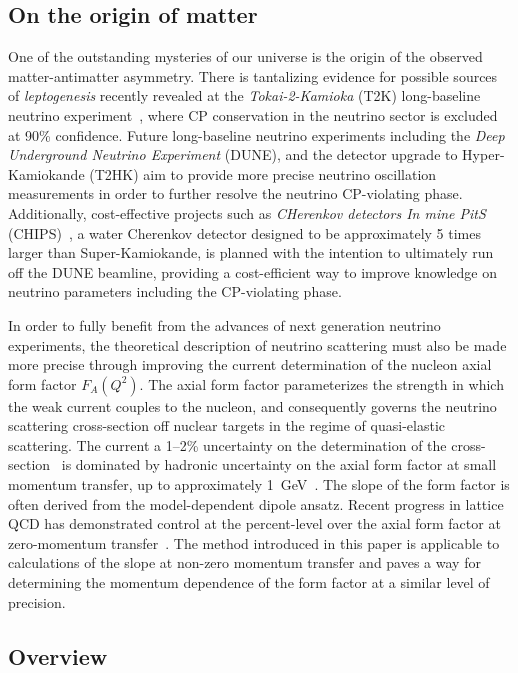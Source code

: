 \documentclass[prd,aps,twocolumn,superscriptaddress,tightenlines,nofootinbib,floatfix,preprintnumbers,10pt]{revtex4-1}
\begin{document}
\subsection{On the origin of matter}
One of the outstanding mysteries of our universe is the origin of the observed matter-antimatter asymmetry. 
There is tantalizing evidence for possible sources of \textit{leptogenesis} recently revealed at the \textit{Tokai-2-Kamioka} (T2K) long-baseline neutrino experiment~\cite{Abe:2017uxa}, where CP conservation in the
neutrino sector is excluded at 90\% confidence.  
Future long-baseline neutrino experiments including the \textit{Deep Underground Neutrino Experiment} (DUNE), and the detector upgrade to Hyper-Kamiokande (T2HK) aim to provide more precise neutrino oscillation measurements in order to further resolve the neutrino CP-violating phase. 
Additionally, cost-effective projects such as \textit{CHerenkov detectors In mine PitS} (CHIPS)~\cite{Adamson:2013xka}, a water Cherenkov detector designed to be approximately 5 times larger than Super-Kamiokande, is planned with the intention to ultimately run off the DUNE beamline, providing a cost-efficient way to improve knowledge on neutrino parameters including the CP-violating phase.

In order to fully benefit from the advances of next generation neutrino experiments, the theoretical description of neutrino scattering must also be made more precise through improving the current determination of the nucleon axial form factor $F_A(Q^2)$. 
The axial form factor parameterizes the strength in which the weak current couples to the nucleon, and consequently governs the neutrino scattering cross-section off nuclear targets in the regime of quasi-elastic scattering. 
The current a 1--2\% uncertainty on the determination of the cross-section~\cite{Adams:2013qkq} is
dominated by hadronic uncertainty on the axial form factor at small momentum transfer, up to approximately 1~GeV~\cite{Day:2012gb}. 
The slope of the form factor is often derived from the model-dependent dipole ansatz. 
Recent progress in lattice QCD has demonstrated control at the percent-level over the axial form factor at zero-momentum transfer~\cite{Chang:2018uxx}.%
The method introduced in this paper is applicable to calculations of the slope at non-zero momentum transfer and paves a way for determining the momentum dependence of the form factor at a similar level of precision.

\subsection{Overview}
\end{document}
